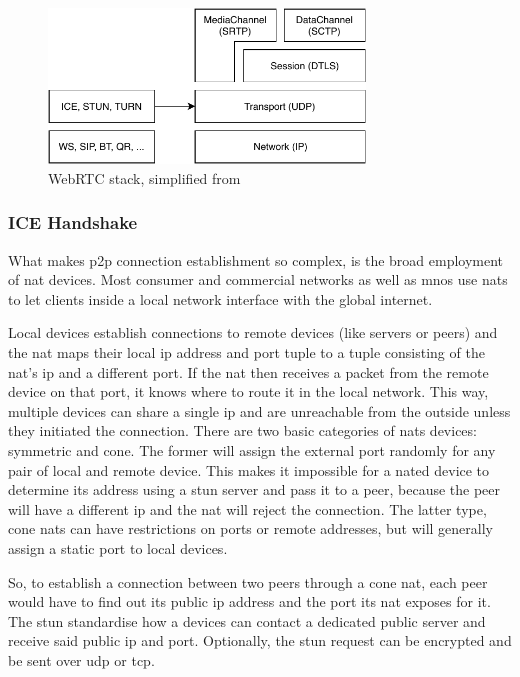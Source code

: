 \begin{figure}
\centering
\includegraphics[width=0.75\textwidth]{graphics/webrtc-proto.pdf}
\caption{WebRTC stack, simplified from \citet[p. 316, fig. 18.3]{high-performance-browser-networking}}
\label{fig:webrtc-proto}
\end{figure}

\subsubsection{ICE Handshake}
What makes \gls{p2p} connection establishment so complex, is the broad employment of \gls{nat} devices. Most consumer and commercial networks as well as \glspl{mno} use \glspl{nat} to let clients inside a local network interface with the global internet.

Local devices establish connections to remote devices (like servers or peers) and the \gls{nat} maps their local \gls{ip} address and port tuple to a tuple consisting of the \gls{nat}'s \gls{ip} and a different port. If the \gls{nat} then receives a packet from the remote device on that port, it knows where to route it in the local network. This way, multiple devices can share a single \gls{ip} and are unreachable from the outside unless they initiated the connection. There are two basic categories of \glspl{nat} devices: symmetric and cone. The former will assign the external port randomly for any pair of local and remote device. This makes it impossible for a \gls{nat}ed device to determine its address using a stun server and pass it to a peer, because the peer will have a different \gls{ip} and the \gls{nat} will reject the connection. The latter type, cone \glspl{nat} can have restrictions on ports or remote addresses, but will generally assign a static port to local devices.

So, to establish a connection between two peers through a cone \gls{nat}, each peer would have to find out its public \gls{ip} address and the port its \gls{nat} exposes for it. The \gls{stun} standardise how a devices can contact a dedicated public server and receive said public \gls{ip} and port. Optionally, the \gls{stun} request can be encrypted and be sent over \gls{udp} or \gls{tcp}.

